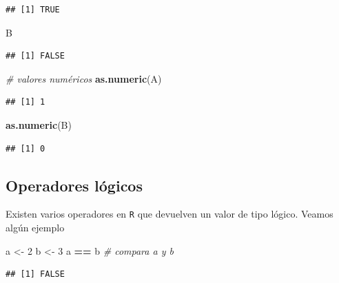 \documentclass[]{book}
\newenvironment{Shaded}{\begin{snugshade}}{\end{snugshade}}
\newcommand{\CommentTok}[1]{\textcolor[rgb]{0.56,0.35,0.01}{\textit{#1}}}
\newcommand{\DecValTok}[1]{\textcolor[rgb]{0.00,0.00,0.81}{#1}}
\newcommand{\KeywordTok}[1]{\textcolor[rgb]{0.13,0.29,0.53}{\textbf{#1}}}
\newcommand{\NormalTok}[1]{#1}
\newcommand{\OperatorTok}[1]{\textcolor[rgb]{0.81,0.36,0.00}{\textbf{#1}}}
\newcommand{\StringTok}[1]{\textcolor[rgb]{0.31,0.60,0.02}{#1}}
\begin{document}
\begin{verbatim}
## [1] TRUE
\end{verbatim}

\begin{Shaded}
\begin{Highlighting}[]
\NormalTok{B}
\end{Highlighting}
\end{Shaded}

\begin{verbatim}
## [1] FALSE
\end{verbatim}

\begin{Shaded}
\begin{Highlighting}[]
\CommentTok{# valores numéricos}
\KeywordTok{as.numeric}\NormalTok{(A)}
\end{Highlighting}
\end{Shaded}

\begin{verbatim}
## [1] 1
\end{verbatim}

\begin{Shaded}
\begin{Highlighting}[]
\KeywordTok{as.numeric}\NormalTok{(B)}
\end{Highlighting}
\end{Shaded}

\begin{verbatim}
## [1] 0
\end{verbatim}

\hypertarget{operadores-logicos}{%
\subsection{Operadores lógicos}\label{operadores-logicos}}

Existen varios operadores en
\texttt{R} que devuelven un valor de tipo lógico. Veamos algún ejemplo

\begin{Shaded}
\begin{Highlighting}[]
\NormalTok{a <-}\StringTok{ }\DecValTok{2}
\NormalTok{b <-}\StringTok{ }\DecValTok{3}
\NormalTok{a }\OperatorTok{==}\StringTok{ }\NormalTok{b  }\CommentTok{# compara a y b}
\end{Highlighting}
\end{Shaded}

\begin{verbatim}
## [1] FALSE
\end{verbatim}
\end{document}
